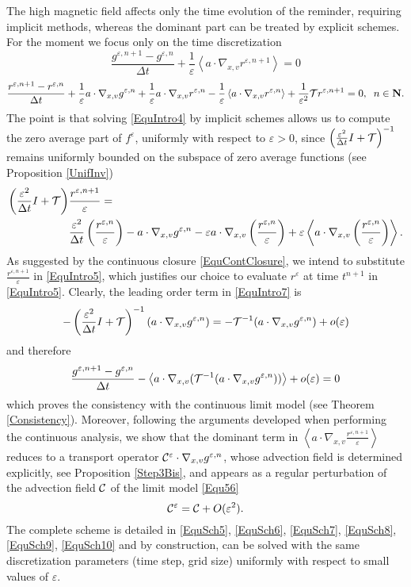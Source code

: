 \documentclass[12pt, a4paper]{article}
\newcommand{\red}{\textcolor{red!95!black}}
\providecommand\mathbb{\bf}
\newcommand\N{{\mathbb N}}
\newcommand{\eps}[0]{
\varepsilon}
\newcommand{\fe}[0]{
f ^\varepsilon}
\newcommand{\re}[0]{
r ^\varepsilon}
\newcommand{\ren}[0]{
r ^{\varepsilon, n}}
\newcommand{\renpo}[0]{
r ^{\varepsilon, n + 1}}
\newcommand{\gen}[0]{
g ^{\varepsilon, n}}
\newcommand{\genpo}[0]{
g ^{\varepsilon, n + 1}}
\newcommand{\nxv}[0]{
\nabla_{x,v}}
\newcommand{\ave}[1]{
\left \langle #1 \right \rangle }
\begin{document}
The high magnetic field affects only the time evolution of the reminder, requiring implicit methods, whereas the dominant part can be treated by explicit schemes. \red{For the moment we focus only on the time discretization
\begin{equation}
\label{EquIntro5} \frac{\genpo - \gen }{\Delta t} + \frac{1}{\eps} \ave{ a \cdot \nxv \renpo } = 0
\end{equation}
\begin{equation}
\label{EquIntro6} \frac{\renpo - \ren}{\Delta t} + \frac{1}{\eps} a \cdot \nxv \gen + \frac{1}{\eps} a \cdot \nxv \ren - \frac{1}{\eps} \ave{ a \cdot \nxv \ren } + \frac{1}{\eps ^2} {\cal T} \renpo = 0,\;\;n \in \N.
\end{equation}
The point is that solving \eqref{EquIntro4} by implicit schemes allows us to compute the zero average part of $\fe$, uniformly with respect to $\eps >0$, since $\left ( \frac{\eps ^2}{\Delta t} I + {\cal T} \right ) ^{-1}$ remains uniformly bounded on the subspace of zero average functions (see Proposition \ref{UnifInv})
\begin{align}
\label{EquIntro7} \left ( \frac{\eps ^2}{\Delta t } I + {\cal T} \right )  & \frac{\renpo}{\eps}  = \\
& \frac{\eps ^2}{\Delta t} \left ( \frac{\ren}{\eps} \right ) -  a \cdot \nxv \gen - \eps a \cdot \nxv \left ( \frac{\ren}{\eps} \right ) + \eps \ave{a \cdot \nxv \left ( \frac{\ren}{\eps} \right ) }  .\nonumber 
\end{align}
As suggested by the continuous closure \eqref{EquContClosure}, we intend to substitute $\frac{\renpo}{\eps}$ in \eqref{EquIntro5}, which justifies our choice to evaluate $\re$ at time $t^{n+1}$ in \eqref{EquIntro5}. Clearly, the leading order term in \eqref{EquIntro7} is
\[
- \left ( \frac{\eps ^2}{\Delta t } I + {\cal T} \right )^{-1} ( a \cdot \nxv \gen ) = - {\cal T}^{-1} (a \cdot \nxv \gen ) + o(\eps)
\]
and therefore
\[
\frac{\genpo - \gen }{\Delta t} -  \ave{ a \cdot \nxv ( {\cal T}^{-1}(a \cdot \nxv \gen ) ) }  + o(\eps)= 0
\]
which proves the consistency with the continuous limit model (see Theorem \ref{Consistency}). Moreover, following the arguments developed when performing the continuous analysis, we show that the dominant term in $\ave{a \cdot \nxv \frac{\renpo}{\eps}}$ reduces to a transport operator ${\cal C}^\eps \cdot \nxv \gen$, whose advection field is determined explicitly, see Proposition \ref{Step3Bis}, and appears as a regular perturbation of the advection field ${\cal C}$ of the limit model \eqref{Equ56}
\[
{\cal C}^\eps = {\cal C} + O(\eps ^2).
\]
The complete scheme is detailed in \eqref{EquSch5}, \eqref{EquSch6}, \eqref{EquSch7}, \eqref{EquSch8}, \eqref{EquSch9}, \eqref{EquSch10} and by construction, can be solved with the same discretization parameters (time step, grid size) uniformly with respect to small values of $\eps$.} 
\end{document}
